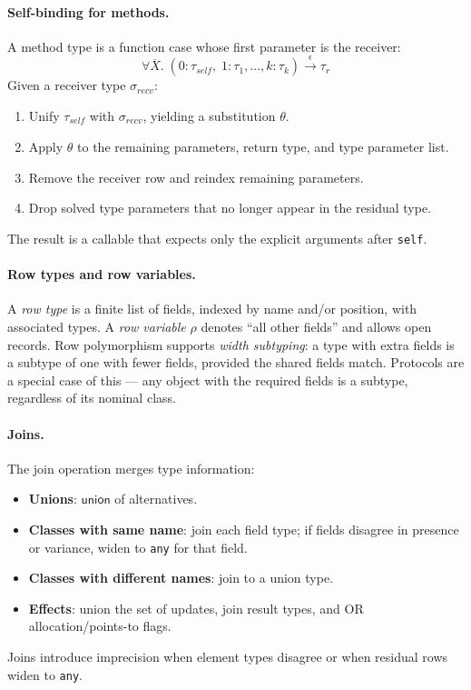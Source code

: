 \paragraph{Self-binding for methods.}
A method type is a function case whose first parameter is the receiver:
\[
\forall \overline{X}.\; (0 : \tau_{\mathit{self}},\; 1:\tau_1, \dots, k:\tau_k) \xrightarrow{\epsilon} \tau_r
\]
Given a receiver type $\sigma_{\mathit{recv}}$:
\begin{enumerate}
    \item Unify $\tau_{\mathit{self}}$ with $\sigma_{\mathit{recv}}$, yielding a substitution $\theta$.
    \item Apply $\theta$ to the remaining parameters, return type, and type parameter list.
    \item Remove the receiver row and reindex remaining parameters.
    \item Drop solved type parameters that no longer appear in the residual type.
\end{enumerate}
The result is a callable that expects only the explicit arguments after \texttt{self}.


\paragraph{Row types and row variables.}
A \emph{row type} is a finite list of fields, indexed by name and/or position, with associated types.
A \emph{row variable} $\rho$ denotes “all other fields” and allows open records.
Row polymorphism supports \emph{width subtyping}: a type with extra fields is a subtype of one with fewer fields, provided the shared fields match.
Protocols are a special case of this — any object with the required fields is a subtype, regardless of its nominal class.

\paragraph{Joins.}
The join operation merges type information:
\begin{itemize}
\item \textbf{Unions}: $\mathsf{union}$ of alternatives.
\item \textbf{Classes with same name}: join each field type; if fields disagree in presence or variance, widen to \texttt{any} for that field.
\item \textbf{Classes with different names}: join to a union type.
\item \textbf{Effects}: union the set of updates, join result types, and OR allocation/points-to flags.
\end{itemize}
Joins introduce imprecision when element types disagree or when residual rows widen to \texttt{any}.

